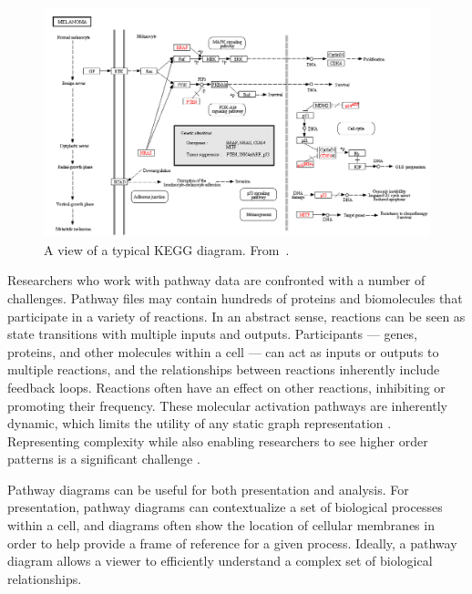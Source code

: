 \documentclass[journal]{vgtc}                %
\begin{document}
\begin{figure}[htb]
  \centering
  \includegraphics[width=\linewidth]{figures/kegg2}
  \caption{\label{fig:kvik} A view of a typical KEGG diagram. From~\cite{Fjukstad2014kvik}.}
\end{figure}


Researchers who work with pathway data are confronted with a number of challenges.
Pathway files may contain hundreds of proteins and biomolecules that participate in a variety of reactions.
In an abstract sense, reactions can be seen as state transitions with multiple inputs and outputs.
Participants --- genes, proteins, and other molecules within a cell --- can act as inputs or outputs to multiple reactions, and the relationships between reactions inherently include feedback loops.
Reactions often have an effect on other reactions, inhibiting or promoting their frequency.
These molecular activation pathways are inherently dynamic, which limits the utility of any static graph representation \cite{kitano2002systems}.
Representing complexity while also enabling researchers to see higher order patterns is a significant challenge \cite{saraiya2005visualizing}.


Pathway diagrams can be useful for both presentation and analysis.
For presentation, pathway diagrams can contextualize a set of biological processes within a cell, and diagrams often show the location of cellular membranes in order to help provide a frame of reference for a given process.
Ideally, a pathway diagram allows a viewer to efficiently understand a complex set of biological relationships.

\end{document}
